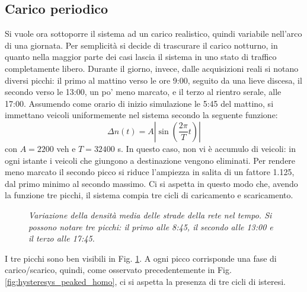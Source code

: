 \documentclass[../main.tex]{subfiles}
\begin{document}
\subsection{Carico periodico}
Si vuole ora sottoporre il sistema ad un carico realistico, quindi variabile nell'arco di una giornata.
Per semplicit\`a si decide di trascurare il carico notturno, in quanto nella maggior parte dei casi lascia il sistema in uno stato di traffico completamente libero.
Durante il giorno, invece, dalle acquisizioni reali si notano diversi picchi: il primo al mattino verso le ore 9:00, seguito da una lieve discesa, il secondo verso le 13:00, un po' meno marcato, e il terzo al rientro serale, alle 17:00.
Assumendo come orario di inizio simulazione le 5:45 del mattino, si immettano veicoli uniformemente nel sistema secondo la seguente funzione:
\begin{equation}
    \Delta n(t) = A \left\lvert \sin\left(\frac{2\pi}{T}t\right) \right\rvert 
\end{equation}
con $A = 2200$ veh e $T = 32400$ s.
In questo caso, non vi \`e accumulo di veicoli: in ogni istante i veicoli che giungono a destinazione vengono eliminati.
Per rendere meno marcato il secondo picco si riduce l'ampiezza in salita di un fattore 1.125, dal primo minimo al secondo massimo.
Ci si aspetta in questo modo che, avendo la funzione tre picchi, il sistema compia tre cicli di caricamento e scaricamento.
\begin{figure}[H]
    \centering
    \caption[Variazione periodica della densit\`a in un reticolo omogeneo]{\emph{Variazione della densit\`a media delle strade della rete nel tempo. Si possono notare tre picchi: il primo alle 8:45, il secondo alle 13:00 e il terzo alle 17:45.}}
    \label{fig:density_time_periodic_homo}
\end{figure}
I tre picchi sono ben visibili in Fig. \ref{fig:density_time_periodic_homo}.
A ogni picco corrisponde una fase di carico/scarico, quindi, come osservato precedentemente in Fig. \ref{fig:hysteresys_peaked_homo}, ci si aspetta la presenza di tre cicli di isteresi.
\end{document}
